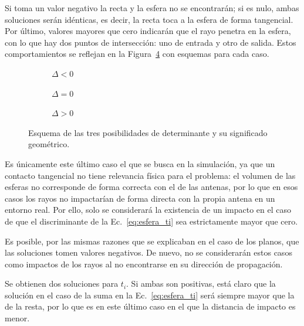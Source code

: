 Si toma un valor negativo la recta y la esfera no se encontrarán; si es nulo, ambas soluciones serán idénticas, es decir, la recta toca a la esfera de forma tangencial.
Por último, valores mayores que cero indicarán que el rayo penetra en la esfera, con lo que hay dos puntos de intersección: uno de entrada y otro de salida.
Estos comportamientos se reflejan en la Figura~\ref{fig:sphere_hit} con esquemas para cada caso.

\begin{figure}[H]
    \centering
    \begin{subfigure}[b]{0.27\textwidth}
        \centering
        
        \caption{$\Delta < 0$}
        \label{fig:sphere_hit_1}
    \end{subfigure}
    \begin{subfigure}[b]{0.27\textwidth}
        \centering
        
        \caption{$\Delta = 0$}
        \label{fig:sphere_hit_2}
    \end{subfigure}
    \begin{subfigure}[b]{0.27\textwidth}
        \centering
        
        \caption{$\Delta > 0$}
        \label{fig:sphere_hit_3}
    \end{subfigure}
    \caption{Esquema de las tres posibilidades de determinante y su significado geométrico.}
    \label{fig:sphere_hit}
\end{figure}

Es únicamente este último caso el que se busca en la simulación, ya que un contacto tangencial no tiene relevancia física para el problema: el volumen de las esferas no corresponde de forma correcta con el de las antenas, por lo que en esos casos los rayos no impactarían de forma directa con la propia antena en un entorno real.
Por ello, solo se considerará la existencia de un impacto en el caso de que el discriminante de la Ec.~\eqref{eq:esfera_ti} sea estrictamente mayor que cero.

Es posible, por las mismas razones que se explicaban en el caso de los planos, que las soluciones tomen valores negativos.
De nuevo, no se considerarán estos casos como impactos de los rayos al no encontrarse en su dirección de propagación.

Se obtienen dos soluciones para $t_i$.
Si ambas son positivas, está claro que la solución en el caso de la suma en la Ec.~\eqref{eq:esfera_ti} será siempre mayor que la de la resta, por lo que es en este último caso en el que la distancia de impacto es menor.

